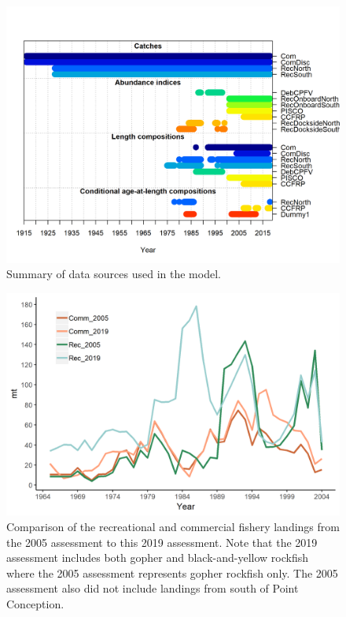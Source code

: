 \documentclass[12pt,]{article}
\begin{document}
\begin{figure}
\centering
\includegraphics{r4ss/plots_mod1/data_plot.png}
\caption{Summary of data sources used in the model.
\label{fig:data_plot}}
\end{figure}

\begin{figure}
\centering
\includegraphics{Figures/assessment_compare.png}
\caption{Comparison of the recreational and commercial fishery landings
from the 2005 assessment to this 2019 assessment. Note that the 2019
assessment includes both gopher and black-and-yellow rockfish where the
2005 assessment represents gopher rockfish only. The 2005 assessment
also did not include landings from south of Point Conception.
\label{fig:Assessment_compare}}
\end{figure}
\end{document}
